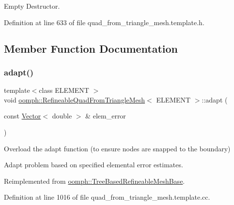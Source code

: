 Empty Destructor. 



Definition at line 633 of file quad\+\_\+from\+\_\+triangle\+\_\+mesh.\+template.\+h.



\subsection{Member Function Documentation}
\mbox{\label{classoomph_1_1RefineableQuadFromTriangleMesh_a7d2efa292dd5dd4930e661fd32e42eec}} 
\subsubsection{\texorpdfstring{adapt()}{adapt()}}
{\footnotesize\ttfamily template$<$class E\+L\+E\+M\+E\+NT $>$ \\
void \hyperlink{classoomph_1_1RefineableQuadFromTriangleMesh}{oomph\+::\+Refineable\+Quad\+From\+Triangle\+Mesh}$<$ E\+L\+E\+M\+E\+NT $>$\+::adapt (\begin{DoxyParamCaption}\item[{const \hyperlink{classoomph_1_1Vector}{Vector}$<$ double $>$ \&}]{elem\+\_\+error }\end{DoxyParamCaption})\hspace{0.3cm}{\ttfamily [virtual]}}



Overload the adapt function (to ensure nodes are snapped to the boundary) 

Adapt problem based on specified elemental error estimates. 

Reimplemented from \hyperlink{classoomph_1_1TreeBasedRefineableMeshBase_ac98d4120b99d5c6cbcf7225a9ee5648d}{oomph\+::\+Tree\+Based\+Refineable\+Mesh\+Base}.



Definition at line 1016 of file quad\+\_\+from\+\_\+triangle\+\_\+mesh.\+template.\+cc.

\mbox{\label{classoomph_1_1RefineableQuadFromTriangleMesh_a73e88bb8c1cc8464f079e928e89a4a14}} 
